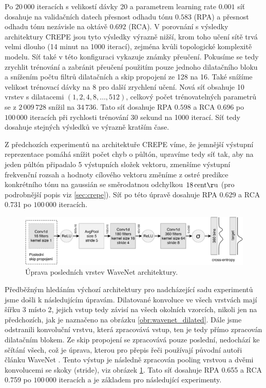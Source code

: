 Po $20\,000$ iteracích s velikostí dávky 20 a parametrem learning rate $0.001$ síť dosahuje na validačních datech přesnost odhadu tónu $0.583$ (RPA) a přesnost odhadu tónu nezávisle na oktávě $0.692$ (RCA). V porovnání s výsledky architektury CREPE jsou tyto výsledky výrazně nižší, krom toho učení sítě trvá velmi dlouho (14 minut na 1000 iterací), zejména kvůli topologické komplexitě modelu. Síť také v této konfiguraci vykazuje známky přeučení. Pokusíme se tedy zrychlit trénování a zabránit přeučení použitím pouze jednoho dilatačního bloku a snížením počtu filtrů dilatačních a skip propojení ze 128 na 16. Také snížíme velikost trénovací dávky na 8 pro další zrychlení učení. Nová síť obsahuje 10 vrstev s dilatacemi $(1, 2, 4, 8, \dots, 512)$, celkový počet trénovatelných parametrů se z $2\,009\,728$ snížil na $34\,736$. Tato síť dosahuje RPA $0.598$ a RCA $0.696$ po $100\,000$ iteracích při rychlosti trénování 30 sekund na 1000 iterací. Síť tedy dosahuje stejných výsledků ve výrazně kratším čase.

Z předchozích experimentů na architektuře CREPE víme, že jemnější výstupní reprezentace pomáhá snížit počet chyb o půltón, upravíme tedy síť tak, aby na jeden půltón připadalo 5 výstupních složek vektoru, zmenšíme výstupní frekvenční rozsah a hodnoty cílového vektoru změníme z ostré predikce konkrétního tónu na  gaussián se směrodatnou odchylkou $18\,\rm centů$ (pro podrobnější popis viz \ref{sec:crepe}). Síť po této úpravě dosahuje RPA 0.629 a RCA 0.731 po $100\,000$ iteracích. 

\begin{figure}[h]\centering
    \includegraphics[scale=0.8]{../img/wavenet_lastlayer_grey}
    \caption{Úprava posledních vrstev WaveNet architektury.}\label{obr:wavenet_lastlayer}
\end{figure}

Předběžným hledáním výchozí architektury pro nadcházející sadu experimen\-tů jsme došli k následujícím úpravám. Dilatované konvoluce ve všech vrstvách mají šířku 3 místo 2, jejich vstup tedy závisí na všech okolních vzorcích, nikoli jen na předchozích, jak je naznačeno na obrázku \ref{obr:wavenet_dilated}. Dále jsme odstranili konvoluční vrstvu, která zpracovává vstup, ten je tedy přímo zpracován dilatačním blokem. Ze skip propojení se zpracovává pouze poslední, nedochází ke sčítání všech, což je úprava, kterou pro přepis řeči používají původní autoři článku WaveNet \cite{Oord2016}. Tento výstup je následně zpracován pooling vrstvou a dvěmi konvolucemi se skoky (stride), viz obrázek \ref{obr:wavenet_lastlayer}. Tato síť dosahuje RPA 0.655 a RCA 0.759 po $100\,000$ iteracích a je základem pro následující experimenty. 

